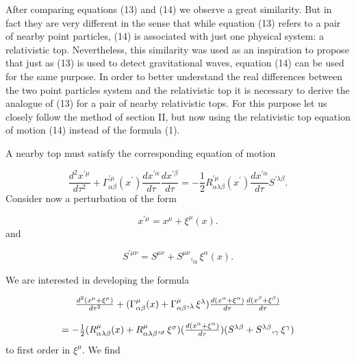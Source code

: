 \documentclass[a4paper,12pt]{article}
\begin{document}
After comparing equations (13) and (14) we observe a great similarity. But
in fact they are very different in the sense that while equation (13) refers
to a pair of nearby point particles, (14) is associated with just one
physical system: a relativistic top. Nevertheless, this similarity was used
as an inspiration to propose that just as (13) is used to detect
gravitational waves, equation (14) can be used for the same purpose. In
order to better understand the real differences between the two point
particles system and the relativistic top it is necessary to derive the
analogue of (13) for a pair of nearby relativistic tops. For this purpose
let us closely follow the method of section II, but now using the
relativistic top equation of motion (14) instead of the formula (1).

A nearby top must satisfy the corresponding equation of motion

\begin{equation}
\frac{d^{2}x^{\prime\mu}}{d\tau^{2}}+\Gamma_{\alpha\beta}^{\prime\mu
}(x^{\prime})\frac{dx^{\prime\alpha}}{d\tau}\frac{dx^{\prime\beta}}{d\tau }=-%
\frac{1}{2}R_{\alpha\lambda\beta}^{\prime\mu}(x^{\prime})\frac
{dx^{\prime\alpha}}{d\tau}S^{\prime\lambda\beta}.  \label{16}
\end{equation}
Consider now a perturbation of the form

\begin{equation}
x^{\prime\mu}=x^{\mu}+\xi^{\mu}(x).  \label{17}
\end{equation}
and

\begin{equation}
S^{\prime\mu\nu}=S^{\mu\nu}+S^{\mu\nu},_{\alpha}\xi^{\alpha}(x).  \label{18}
\end{equation}

We are interested in developing the formula

\begin{equation}
\begin{array}{c}
\frac{d^{2}(x^{\mu }+\xi ^{\mu })}{d\tau ^{2}}+(\Gamma _{\alpha \beta }^{\mu
}(x)+\Gamma _{\alpha \beta }^{\mu },_{\lambda }\xi ^{\lambda })\frac{%
d(x^{\alpha }+\xi ^{\alpha })}{d\tau }\frac{d(x^{\beta }+\xi ^{\beta })}{%
d\tau } \\ 
\\ 
=-\frac{1}{2}(R_{\alpha \lambda \beta }^{\mu }(x)+R_{\alpha \lambda \beta
}^{\mu },_{\sigma }\xi ^{\sigma })(\frac{d(x^{\alpha }+\xi ^{\alpha })}{%
d\tau })(S^{\lambda \beta }+S^{\lambda \beta },_{\gamma }\xi ^{\gamma })
\end{array}
\label{19}
\end{equation}
to first order in $\xi ^{\mu }.$ We find
\end{document}
